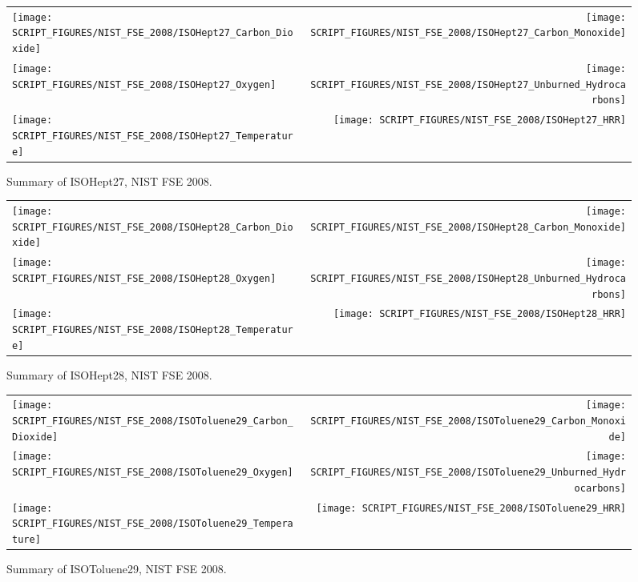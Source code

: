 \begin{figure}[h]
\begin{tabular*}{\textwidth}{l@{\extracolsep{\fill}}r}
\texttt{[image: SCRIPT\_FIGURES/NIST\_FSE\_2008/ISOHept27\_Carbon\_Dioxide]} &
\texttt{[image: SCRIPT\_FIGURES/NIST\_FSE\_2008/ISOHept27\_Carbon\_Monoxide]} \\
\texttt{[image: SCRIPT\_FIGURES/NIST\_FSE\_2008/ISOHept27\_Oxygen]} &
\texttt{[image: SCRIPT\_FIGURES/NIST\_FSE\_2008/ISOHept27\_Unburned\_Hydrocarbons]} \\
\texttt{[image: SCRIPT\_FIGURES/NIST\_FSE\_2008/ISOHept27\_Temperature]} &
\texttt{[image: SCRIPT\_FIGURES/NIST\_FSE\_2008/ISOHept27\_HRR]}
\end{tabular*}
\caption[Summary of ISOHept27, NIST FSE 2008]{Summary of ISOHept27, NIST FSE 2008.}
\label{NIST_FSE_1994_ISOHept27}
\end{figure}

\begin{figure}[h]
\begin{tabular*}{\textwidth}{l@{\extracolsep{\fill}}r}
\texttt{[image: SCRIPT\_FIGURES/NIST\_FSE\_2008/ISOHept28\_Carbon\_Dioxide]} &
\texttt{[image: SCRIPT\_FIGURES/NIST\_FSE\_2008/ISOHept28\_Carbon\_Monoxide]} \\
\texttt{[image: SCRIPT\_FIGURES/NIST\_FSE\_2008/ISOHept28\_Oxygen]} &
\texttt{[image: SCRIPT\_FIGURES/NIST\_FSE\_2008/ISOHept28\_Unburned\_Hydrocarbons]} \\
\texttt{[image: SCRIPT\_FIGURES/NIST\_FSE\_2008/ISOHept28\_Temperature]} &
\texttt{[image: SCRIPT\_FIGURES/NIST\_FSE\_2008/ISOHept28\_HRR]}
\end{tabular*}
\caption[Summary of ISOHept28, NIST FSE 2008]{Summary of ISOHept28, NIST FSE 2008.}
\label{NIST_FSE_1994_ISOHept28}
\end{figure}

\begin{figure}[h]
\begin{tabular*}{\textwidth}{l@{\extracolsep{\fill}}r}
\texttt{[image: SCRIPT\_FIGURES/NIST\_FSE\_2008/ISOToluene29\_Carbon\_Dioxide]} &
\texttt{[image: SCRIPT\_FIGURES/NIST\_FSE\_2008/ISOToluene29\_Carbon\_Monoxide]} \\
\texttt{[image: SCRIPT\_FIGURES/NIST\_FSE\_2008/ISOToluene29\_Oxygen]} &
\texttt{[image: SCRIPT\_FIGURES/NIST\_FSE\_2008/ISOToluene29\_Unburned\_Hydrocarbons]} \\
\texttt{[image: SCRIPT\_FIGURES/NIST\_FSE\_2008/ISOToluene29\_Temperature]} &
\texttt{[image: SCRIPT\_FIGURES/NIST\_FSE\_2008/ISOToluene29\_HRR]}
\end{tabular*}
\caption[Summary of ISOToluene29, NIST FSE 2008]{Summary of ISOToluene29, NIST FSE 2008.}
\label{NIST_FSE_1994_ISOToluene29}
\end{figure}

